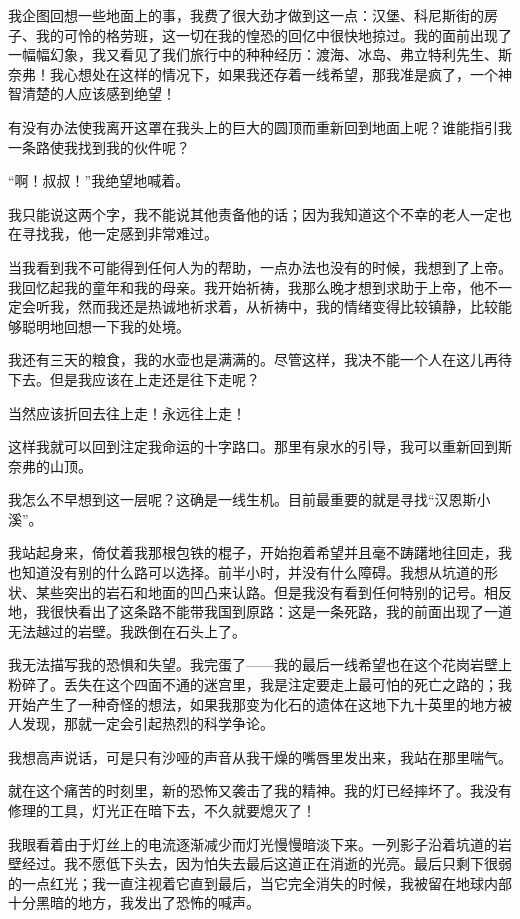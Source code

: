 \documentclass[10pt]{book}
\begin{document}
我企图回想一些地面上的事，我费了很大劲才做到这一点：汉堡、科尼斯街的房子、我的可怜的格劳班，这一切在我的惶恐的回亿中很快地掠过。我的面前出现了一幅幅幻象，我又看见了我们旅行中的种种经历：渡海、冰岛、弗立特利先生、斯奈弗！我心想处在这样的情况下，如果我还存着一线希望，那我准是疯了，一个神智清楚的人应该感到绝望！

有没有办法使我离开这罩在我头上的巨大的圆顶而重新回到地面上呢？谁能指引我一条路使我找到我的伙件呢？

“啊！叔叔！”我绝望地喊着。

我只能说这两个字，我不能说其他责备他的话；因为我知道这个不幸的老人一定也在寻找我，他一定感到非常难过。

当我看到我不可能得到任何人为的帮助，一点办法也没有的时候，我想到了上帝。我回忆起我的童年和我的母亲。我开始祈祷，我那么晚才想到求助于上帝，他不一定会听我，然而我还是热诚地祈求着，从祈祷中，我的情绪变得比较镇静，比较能够聪明地回想一下我的处境。

我还有三天的粮食，我的水壶也是满满的。尽管这样，我决不能一个人在这儿再待下去。但是我应该在上走还是往下走呢？

当然应该折回去往上走！永远往上走！

这样我就可以回到注定我命运的十字路口。那里有泉水的引导，我可以重新回到斯奈弗的山顶。

我怎么不早想到这一层呢？这确是一线生机。目前最重要的就是寻找“汉恩斯小溪”。

我站起身来，倚仗着我那根包铁的棍子，开始抱着希望并且毫不踌躇地往回走，我也知道没有别的什么路可以选择。前半小时，并没有什么障碍。我想从坑道的形状、某些突出的岩石和地面的凹凸来认路。但是我没有看到任何特别的记号。相反地，我很快看出了这条路不能带我国到原路：这是一条死路，我的前面出现了一道无法越过的岩壁。我跌倒在石头上了。

我无法描写我的恐惧和失望。我完蛋了——我的最后一线希望也在这个花岗岩壁上粉碎了。丢失在这个四面不通的迷宫里，我是注定要走上最可怕的死亡之路的；我开始产生了一种奇怪的想法，如果我那变为化石的遗体在这地下九十英里的地方被人发现，那就一定会引起热烈的科学争论。

我想高声说话，可是只有沙哑的声音从我干燥的嘴唇里发出来，我站在那里喘气。

就在这个痛苦的时刻里，新的恐怖又袭击了我的精神。我的灯已经摔坏了。我没有修理的工具，灯光正在暗下去，不久就要熄灭了！

我眼看着由于灯丝上的电流逐渐减少而灯光慢慢暗淡下来。一列影子沿着坑道的岩壁经过。我不愿低下头去，因为怕失去最后这道正在消逝的光亮。最后只剩下很弱的一点红光；我一直注视着它直到最后，当它完全消失的时候，我被留在地球内部十分黑暗的地方，我发出了恐怖的喊声。
\end{document}
